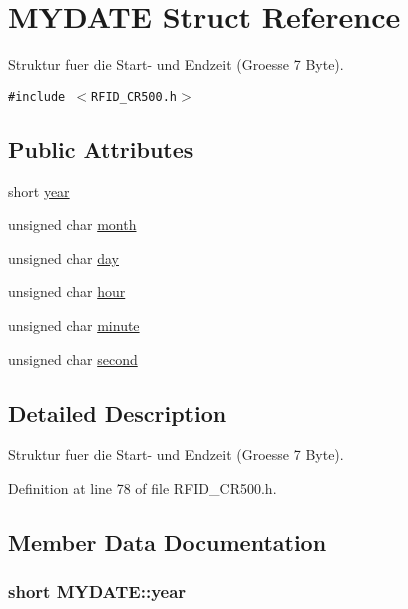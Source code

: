 \hypertarget{struct_m_y_d_a_t_e}{
\section{MYDATE Struct Reference}
\label{struct_m_y_d_a_t_e}
}
Struktur fuer die Start- und Endzeit (Groesse 7 Byte).  


{\tt \#include $<$RFID\_\-CR500.h$>$}

\subsection*{Public Attributes}
\begin{CompactItemize}
\item 
short \hyperlink{struct_m_y_d_a_t_e_7b77b272c8bcf373308e6903dcd440ae}{year}
\item 
unsigned char \hyperlink{struct_m_y_d_a_t_e_406d9a0047246b45782cb239747cf769}{month}
\item 
unsigned char \hyperlink{struct_m_y_d_a_t_e_91fee9ad577107c8efba01c1322b2b54}{day}
\item 
unsigned char \hyperlink{struct_m_y_d_a_t_e_426549a0228935f65a4bcbc918e69031}{hour}
\item 
unsigned char \hyperlink{struct_m_y_d_a_t_e_8224e4f5dd777baae8acf02944365d54}{minute}
\item 
unsigned char \hyperlink{struct_m_y_d_a_t_e_063cbf62fc1c131f82e7b5ff7a3ec85f}{second}
\end{CompactItemize}


\subsection{Detailed Description}
Struktur fuer die Start- und Endzeit (Groesse 7 Byte). 

Definition at line 78 of file RFID\_\-CR500.h.

\subsection{Member Data Documentation}
\hypertarget{struct_m_y_d_a_t_e_7b77b272c8bcf373308e6903dcd440ae}{
\subsubsection[year]{\setlength{\rightskip}{0pt plus 5cm}short {\bf MYDATE::year}}}
\label{struct_m_y_d_a_t_e_7b77b272c8bcf373308e6903dcd440ae}





